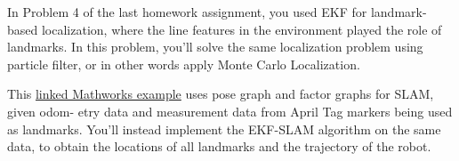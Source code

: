 \documentclass[answers]{exam}
\begin{document}
\begin{questions}
    \begin{solution}
    \end{solution}

    \question[25]
    In Problem 4 of the last homework assignment, you used EKF for landmark-based localization, where the line features in the environment played the role of landmarks. In this problem, you'll solve the same localization problem using particle filter, or in other words apply Monte Carlo Localization.

    \begin{solution}
    \end{solution}

    \question[(Bonus) 20]
    This \href{https://www.mathworks.com/help/nav/ug/landmark-slam-using-apriltag-markers.html}{linked Mathworks example} uses pose graph and factor graphs for SLAM, given odom-
    etry data and measurement data from April Tag markers being used as landmarks. You'll
    instead implement the EKF-SLAM algorithm on the same data, to obtain the locations of all
    landmarks and the trajectory of the robot.

    \begin{solution}
    \end{solution}
\end{questions}
\end{document}
